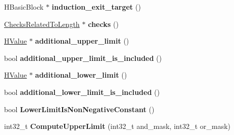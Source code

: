 \begin{DoxyCompactItemize}
\item 
\hypertarget{classv8_1_1internal_1_1_v8___f_i_n_a_l_a26cc6fc3e885dec2af42d1ddf1a63847}{}H\+Basic\+Block $\ast$ {\bfseries induction\+\_\+exit\+\_\+target} ()\label{classv8_1_1internal_1_1_v8___f_i_n_a_l_a26cc6fc3e885dec2af42d1ddf1a63847}

\item 
\hypertarget{classv8_1_1internal_1_1_v8___f_i_n_a_l_a8625119e3a57b6195859e4f533f8040e}{}\hyperlink{classv8_1_1internal_1_1_v8___f_i_n_a_l_1_1_checks_related_to_length}{Checks\+Related\+To\+Length} $\ast$ {\bfseries checks} ()\label{classv8_1_1internal_1_1_v8___f_i_n_a_l_a8625119e3a57b6195859e4f533f8040e}

\item 
\hypertarget{classv8_1_1internal_1_1_v8___f_i_n_a_l_af391fbaa0535cf5e4c5f9291afb2b390}{}\hyperlink{classv8_1_1internal_1_1_h_value}{H\+Value} $\ast$ {\bfseries additional\+\_\+upper\+\_\+limit} ()\label{classv8_1_1internal_1_1_v8___f_i_n_a_l_af391fbaa0535cf5e4c5f9291afb2b390}

\item 
\hypertarget{classv8_1_1internal_1_1_v8___f_i_n_a_l_a71d46de6d1076f68c16f805ca0efafe2}{}bool {\bfseries additional\+\_\+upper\+\_\+limit\+\_\+is\+\_\+included} ()\label{classv8_1_1internal_1_1_v8___f_i_n_a_l_a71d46de6d1076f68c16f805ca0efafe2}

\item 
\hypertarget{classv8_1_1internal_1_1_v8___f_i_n_a_l_a255c80ae62c9aa2511b22a784066cbef}{}\hyperlink{classv8_1_1internal_1_1_h_value}{H\+Value} $\ast$ {\bfseries additional\+\_\+lower\+\_\+limit} ()\label{classv8_1_1internal_1_1_v8___f_i_n_a_l_a255c80ae62c9aa2511b22a784066cbef}

\item 
\hypertarget{classv8_1_1internal_1_1_v8___f_i_n_a_l_a0aa428d9bd9534959e27f990bba1be96}{}bool {\bfseries additional\+\_\+lower\+\_\+limit\+\_\+is\+\_\+included} ()\label{classv8_1_1internal_1_1_v8___f_i_n_a_l_a0aa428d9bd9534959e27f990bba1be96}

\item 
\hypertarget{classv8_1_1internal_1_1_v8___f_i_n_a_l_adad808aede9ec60d2d73336ef466cd6c}{}bool {\bfseries Lower\+Limit\+Is\+Non\+Negative\+Constant} ()\label{classv8_1_1internal_1_1_v8___f_i_n_a_l_adad808aede9ec60d2d73336ef466cd6c}

\item 
\hypertarget{classv8_1_1internal_1_1_v8___f_i_n_a_l_a0f42967a64494a0020b3452300c48a25}{}int32\+\_\+t {\bfseries Compute\+Upper\+Limit} (int32\+\_\+t and\+\_\+mask, int32\+\_\+t or\+\_\+mask)\label{classv8_1_1internal_1_1_v8___f_i_n_a_l_a0f42967a64494a0020b3452300c48a25}


\end{DoxyCompactItemize}
